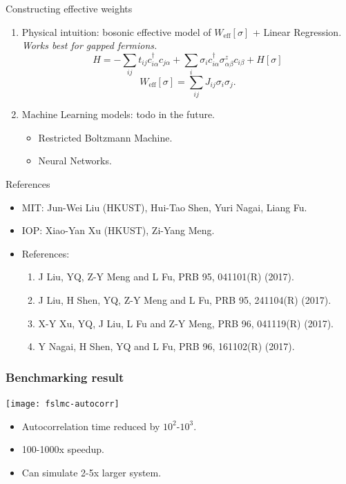 \documentclass[xcolor=table, 10pt, aspectratio=43]{beamer}
\begin{document}
\begin{frame}{Constructing effective weights}
\begin{enumerate}
  \item Physical intuition: bosonic effective model of $W_{\text{eff}}[\sigma]$
  + Linear Regression.\\
  \emph{Works best for gapped fermions.}
  \[H=-\sum_{ij}t_{ij}c_{i\alpha}^\dagger c_{j\alpha}
  +\sum_i\sigma_ic_{i\alpha}^\dagger\sigma^z_{\alpha\beta} c_{i\beta}
  +H[\sigma]\]
  \[W_{\text{eff}}[\sigma]=\sum_{ij}J_{ij}\sigma_i\sigma_j.\]
  \item Machine Learning models: todo in the future.
  \begin{itemize}
    \item Restricted Boltzmann Machine.
    \item Neural Networks.
  \end{itemize}
\end{enumerate}
\end{frame}

\begin{frame}{References}
\begin{itemize}
\item MIT: Jun-Wei Liu (HKUST), Hui-Tao Shen, Yuri Nagai, Liang Fu.
\item IOP: Xiao-Yan Xu (HKUST), Zi-Yang Meng.
\item References:
\begin{enumerate}
  \item J Liu, YQ, Z-Y Meng and L Fu, PRB 95, 041101(R) (2017).
  \item J Liu, H Shen, YQ, Z-Y Meng and L Fu, PRB 95, 241104(R) (2017).
  \item \alert{X-Y Xu, YQ, J Liu, L Fu and Z-Y Meng, PRB 96, 041119(R) (2017).}
  \item Y Nagai, H Shen, YQ and L Fu, PRB 96, 161102(R) (2017).
\end{enumerate}
\end{itemize}
\end{frame}

\begin{frame}
	\frametitle{Benchmarking result}
	\begin{center}
		\texttt{[image: fslmc-autocorr]}
	\end{center}
	\begin{itemize}
		\item Autocorrelation time reduced by $10^2$-$10^3$.
		\item 100-1000x speedup.
		\item Can simulate 2-5x larger system.
	\end{itemize}
\end{frame}
\end{document}
